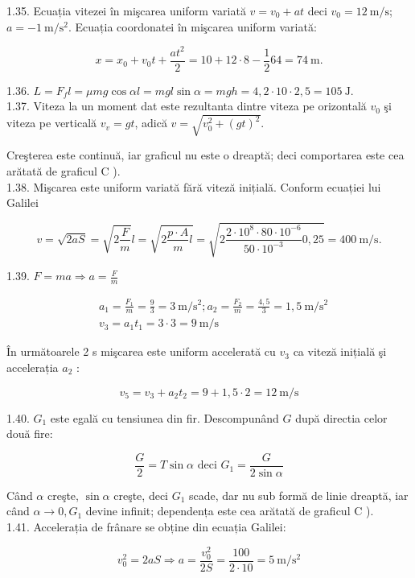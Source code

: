 \documentclass[10pt]{article}
\begin{document}
1.35. Ecuația vitezei în mişcarea uniform variată $v=v_{0}+a t$ deci $v_{0}=12 \mathrm{~m} / \mathrm{s}$; $a=-1 \mathrm{~m} / \mathrm{s}^{2}$. Ecuația coordonatei în mişcarea uniform variată:

$$
x=x_{0}+v_{0} t+\frac{a t^{2}}{2}=10+12 \cdot 8-\frac{1}{2} 64=74 \mathrm{~m} .
$$

1.36. $L=F_{f} l=\mu m g \cos \alpha l=m g l \sin \alpha=m g h=4,2 \cdot 10 \cdot 2,5=105 \mathrm{~J}$.\\
1.37. Viteza la un moment dat este rezultanta dintre viteza pe orizontală $v_{0}$ şi viteza pe verticală $v_{v}=g t$, adică $v=\sqrt{v_{0}^{2}+(g t)^{2}}$.

Creşterea este continuă, iar graficul nu este o dreaptă; deci comportarea este cea arătată de graficul C ).\\
1.38. Mişcarea este uniform variată fără viteză inițială. Conform ecuației lui Galilei

$$
v=\sqrt{2 a S}=\sqrt{2 \frac{F}{m}} l=\sqrt{2 \frac{p \cdot A}{m} l}=\sqrt{2 \frac{2 \cdot 10^{8} \cdot 80 \cdot 10^{-6}}{50 \cdot 10^{-3}} 0,25}=400 \mathrm{~m} / \mathrm{s} .
$$

1.39. $F=m a \Rightarrow a=\frac{F}{m}$

$$
\begin{aligned}
& a_{1}=\frac{F_{1}}{m}=\frac{9}{3}=3 \mathrm{~m} / \mathrm{s}^{2} ; a_{2}=\frac{F_{2}}{m}=\frac{4,5}{3}=1,5 \mathrm{~m} / \mathrm{s}^{2} \\
& v_{3}=a_{1} t_{1}=3 \cdot 3=9 \mathrm{~m} / \mathrm{s}
\end{aligned}
$$

În următoarele 2 s mişcarea este uniform accelerată cu $v_{3}$ ca viteză inițială şi accelerația $a_{2}$ :

$$
v_{5}=v_{3}+a_{2} t_{2}=9+1,5 \cdot 2=12 \mathrm{~m} / \mathrm{s}
$$

1.40. $G_{1}$ este egală cu tensiunea din fir. Descompunând $G$ după directia celor două fire:

$$
\frac{G}{2}=T \sin \alpha \text { deci } G_{1}=\frac{G}{2 \sin \alpha}
$$

Când $\alpha$ creşte, $\sin \alpha$ creşte, deci $G_{1}$ scade, dar nu sub formă de linie dreaptă, iar când $\alpha \rightarrow 0, G_{1}$ devine infinit; dependența este cea arătată de graficul C ).\\
1.41. Accelerația de frânare se obține din ecuația Galilei:

$$
v_{0}^{2}=2 a S \Rightarrow a=\frac{v_{0}^{2}}{2 S}=\frac{100}{2 \cdot 10}=5 \mathrm{~m} / \mathrm{s}^{2}
$$
\end{document}
